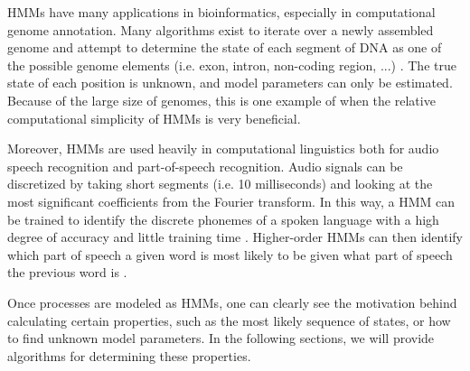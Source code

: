 HMMs have many applications in bioinformatics, especially in computational genome annotation. Many algorithms exist to iterate over a newly assembled genome and attempt to determine the state of each segment of DNA as one of the possible genome elements (i.e. exon, intron, non-coding region, ...) \cite{Stanke03}. The true state of each position is unknown, and model parameters can only be estimated. Because of the large size of genomes, this is one example of when the relative computational simplicity of HMMs is very beneficial. 

Moreover, HMMs are used heavily in computational linguistics both for audio speech recognition and part-of-speech recognition. Audio signals can be discretized by taking short segments (i.e. 10 milliseconds) and looking at the most significant coefficients from the Fourier transform. In this way, a HMM can be trained to identify the discrete phonemes of a spoken language with a high degree of accuracy and little training time \cite{Gales07}. Higher-order HMMs can then identify which part of speech a given word is most likely to be given what part of speech the previous word is \cite{Hull92}.

Once processes are modeled as HMMs, one can clearly see the motivation behind calculating certain properties, such as the most likely sequence of states, or how to find unknown model parameters. In the following sections, we will provide algorithms for determining these properties.